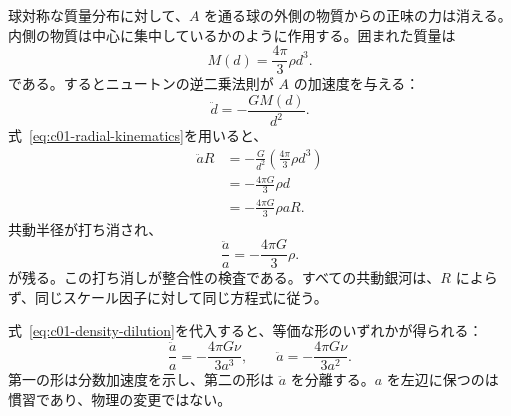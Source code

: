 球対称な質量分布に対して、\(A\) を通る球の外側の物質からの正味の力は消える。内側の物質は中心に集中しているかのように作用する。囲まれた質量は
\begin{equation}
M(d)=\frac{4\pi}{3}\rho d^3.
\label{eq:c01-enclosed-mass}
\end{equation}
である。するとニュートンの逆二乗法則が \(A\) の加速度を与える：
\begin{equation}
\ddot d=-\frac{GM(d)}{d^2}.
\end{equation}
式~\eqref{eq:c01-radial-kinematics}を用いると、
\begin{align}
\ddot a R
&=-\frac{G}{d^2}\left(\frac{4\pi}{3}\rho d^3\right) \\
&=-\frac{4\pi G}{3}\rho d \\
&=-\frac{4\pi G}{3}\rho aR.
\end{align}
共動半径が打ち消され、
\begin{equation}
\boxed{\frac{\ddot a}{a}=-\frac{4\pi G}{3}\rho.}
\label{eq:c01-acceleration}
\end{equation}
が残る。この打ち消しが整合性の検査である。すべての共動銀河は、\(R\) によらず、同じスケール因子に対して同じ方程式に従う。

式~\eqref{eq:c01-density-dilution}を代入すると、等価な形のいずれかが得られる：
\begin{equation}
\frac{\ddot a}{a}=-\frac{4\pi G\nu}{3a^3},
\qquad
\ddot a=-\frac{4\pi G\nu}{3a^2}.
\label{eq:c01-acceleration-nu}
\end{equation}
第一の形は分数加速度を示し、第二の形は \(\ddot a\) を分離する。\(a\) を左辺に保つのは慣習であり、物理の変更ではない。

\begin{classroomqa}
\end{classroomqa}

\begin{classroomqa}
\end{classroomqa}

